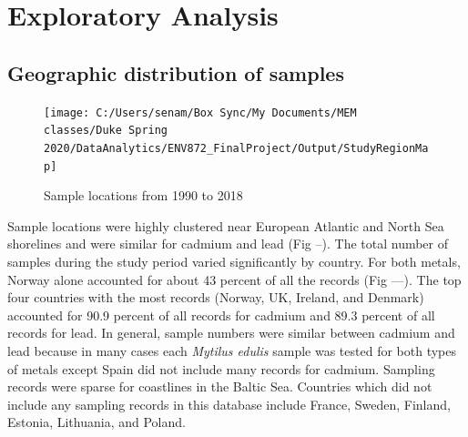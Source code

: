 \documentclass[
  12pt,
]{article}
\begin{document}
\newpage

\hypertarget{exploratory-analysis}{%
\section{Exploratory Analysis}\label{exploratory-analysis}}

\hypertarget{geographic-distribution-of-samples}{%
\subsection{Geographic distribution of
samples}\label{geographic-distribution-of-samples}}

\begin{figure}
\texttt{[image: C:/Users/senam/Box Sync/My Documents/MEM classes/Duke Spring 2020/DataAnalytics/ENV872\_FinalProject/Output/StudyRegionMap]} \caption{Sample locations from 1990 to 2018}\label{fig:unnamed-chunk-1}
\end{figure}

Sample locations were highly clustered near European Atlantic and North
Sea shorelines and were similar for cadmium and lead (Fig --). The total
number of samples during the study period varied significantly by
country. For both metals, Norway alone accounted for about 43 percent of
all the records (Fig ---). The top four countries with the most records
(Norway, UK, Ireland, and Denmark) accounted for 90.9 percent of all
records for cadmium and 89.3 percent of all records for lead. In
general, sample numbers were similar between cadmium and lead because in
many cases each \emph{Mytilus edulis} sample was tested for both types
of metals except Spain did not include many records for cadmium.
Sampling records were sparse for coastlines in the Baltic Sea. Countries
which did not include any sampling records in this database include
France, Sweden, Finland, Estonia, Lithuania, and Poland.
\end{document}
